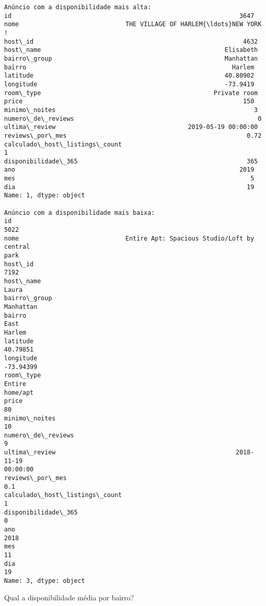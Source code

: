 \documentclass[11pt]{article}
\begin{document}
    \begin{Verbatim}[commandchars=\\\{\}]
Anúncio com a disponibilidade mais alta:
id                                                              3647
nome                             THE VILLAGE OF HARLEM{\ldots}NEW YORK !
host\_id                                                         4632
host\_name                                                  Elisabeth
bairro\_group                                               Manhattan
bairro                                                        Harlem
latitude                                                    40.80902
longitude                                                   -73.9419
room\_type                                               Private room
price                                                            150
minimo\_noites                                                      3
numero\_de\_reviews                                                  0
ultima\_review                                    2019-05-19 00:00:00
reviews\_por\_mes                                                 0.72
calculado\_host\_listings\_count                                      1
disponibilidade\_365                                              365
ano                                                             2019
mes                                                                5
dia                                                               19
Name: 1, dtype: object

Anúncio com a disponibilidade mais baixa:
id
5022
nome                             Entire Apt: Spacious Studio/Loft by central
park
host\_id
7192
host\_name
Laura
bairro\_group
Manhattan
bairro                                                                East
Harlem
latitude
40.79851
longitude
-73.94399
room\_type                                                         Entire
home/apt
price
80
minimo\_noites
10
numero\_de\_reviews
9
ultima\_review                                                 2018-11-19
00:00:00
reviews\_por\_mes
0.1
calculado\_host\_listings\_count
1
disponibilidade\_365
0
ano
2018
mes
11
dia
19
Name: 3, dtype: object
    \end{Verbatim}

    Qual a disponibilidade média por bairro?
\end{document}
